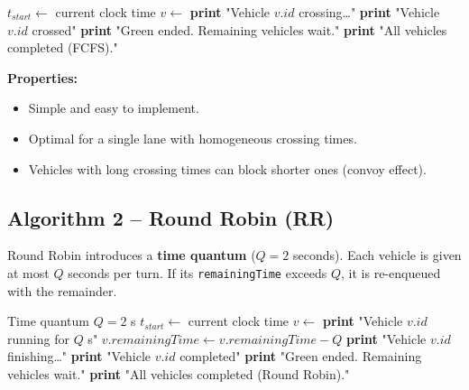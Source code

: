 \documentclass[12pt,a4paper]{article}
\begin{document}
\begin{algorithm}[H]
\caption{FCFS Traffic Signal Scheduling}
\label{alg:fcfs}
\begin{algorithmic}[1]
    \State {}  
    \State $t_{start} \leftarrow$ current clock time
        \State $v \leftarrow$ 
        \State \textbf{print} "Vehicle $v.id$ crossing\ldots"
        \State {}
        \State \textbf{print} "Vehicle $v.id$ crossed"
    \EndWhile
    \State \textbf{print} "Green ended. Remaining vehicles wait."
\EndWhile
\State \textbf{print} "All vehicles completed (FCFS)."
\end{algorithmic}
\end{algorithm}

\textbf{Properties:}
\begin{itemize}
    \item Simple and easy to implement.
    \item Optimal for a single lane with homogeneous crossing times.
    \item Vehicles with long crossing times can block shorter ones (convoy effect).
\end{itemize}

\subsection{Algorithm 2 -- Round Robin (RR)}

Round Robin introduces a \textbf{time quantum} ($Q = 2$ seconds). Each vehicle is given at most $Q$ seconds per turn. If its \texttt{remainingTime} exceeds $Q$, it is re-enqueued with the remainder.

\begin{algorithm}[H]
\caption{Round Robin Traffic Signal Scheduling}
\label{alg:rr}
\begin{algorithmic}[1]
\Require Time quantum $Q = 2$ s
    \State {}  
    \State $t_{start} \leftarrow$ current clock time
        \State $v \leftarrow$ 
            \State \textbf{print} "Vehicle $v.id$ running for $Q$ s"
            \State {}
            \State $v.remainingTime \leftarrow v.remainingTime - Q$
            \State {}  
        \Else
            \State \textbf{print} "Vehicle $v.id$ finishing\ldots"
            \State {}
            \State \textbf{print} "Vehicle $v.id$ completed"
        \EndIf
    \EndWhile
    \State \textbf{print} "Green ended. Remaining vehicles wait."
\EndWhile
\State \textbf{print} "All vehicles completed (Round Robin)."
\end{algorithmic}
\end{algorithm}
\end{document}
